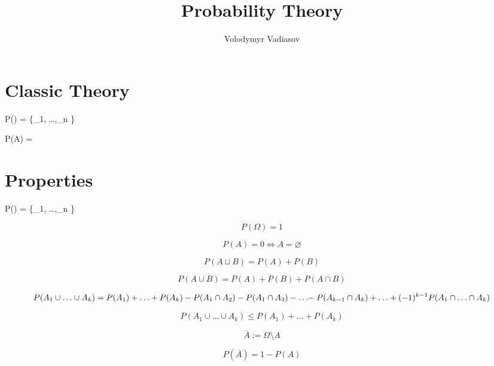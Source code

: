 \documentclass[11pt]{article}
\author{Volodymyr Vadiasov}
\title{Probability Theory}
\begin{document}
    \maketitle

    \section{Classic Theory}\label{sec:classic}


    P(\Omega) = \{\omega_1, \ldots ,\omega_n \}


    P(A) = 

    \section{Properties}\label{sec:properties}

    P(\Omega) = \{\omega_1, \ldots ,\omega_n \}

    \begin{equation}
        P(\Omega) = 1
    \end{equation}

    \begin{equation}
        P(A) = 0 \iff A = \varnothing
    \end{equation}

    \begin{equation}
        P(A\sqcup B) = P(A) + P(B)
    \end{equation}

    \begin{equation}
        P(A\cup B) = P(A) + P(B) + P(A\cap B)
    \end{equation}

    \begin{equation}
        P(A_1\cup \ldots \cup A_k) = P(A_1) +  \ldots + P(A_k) - P(A_1\cap A_2) - P(A_1\cap A_3) \nonumber
        - \ldots \negmedspace - P(A_{k-1}\cap A_k) + \ldots + (-1)^{k-1}P(A_1\cap \ldots \cap A_k)
    \end{equation}

    \begin{equation}
        P(A_1\cup \ldots \cup A_k) \leq P(A_1) +  \ldots + P(A_k)
    \end{equation}

    \begin{equation}
        \overline{A} := \Omega \setminus A
    \end{equation}

    \begin{equation}
        P(\overline{A}) = 1 - P(A)
    \end{equation}
\end{document}
